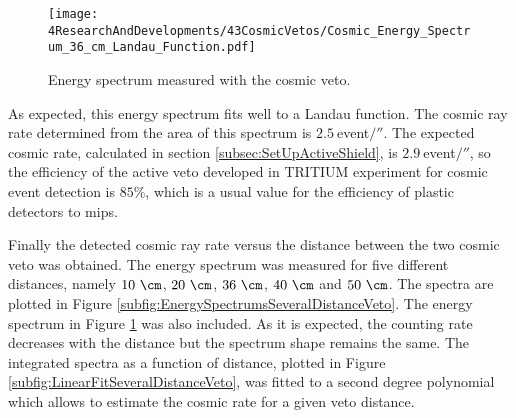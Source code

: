 \begin{figure}[h]
\centering
\texttt{[image: 4ResearchAndDevelopments/43CosmicVetos/Cosmic\_Energy\_Spectrum\_36\_cm\_Landau\_Function.pdf]}
\caption{Energy spectrum measured with the cosmic veto.\label{fig:EnergySpectrumCosmicVeto}}
\end{figure}
As expected, this energy spectrum fits well to a Landau function. The cosmic ray rate determined from the area of this spectrum is $2.5~$event$/\second$. The expected cosmic rate, calculated in section \ref{subsec:SetUpActiveShield}, is $2.9~$event$/\second$, so the efficiency of the active veto developed in TRITIUM experiment for cosmic event detection is $85\%$, which is a usual value for the efficiency of plastic detectors to mips.

Finally the detected cosmic ray rate versus the distance between the two cosmic veto was obtained. The energy spectrum was measured for five different distances, namely $10~\cm$, $20~\cm$, $36~\cm$, $40~\cm$ and $50~\cm$. The spectra are plotted in Figure \ref{subfig:EnergySpectrumsSeveralDistanceVeto}. The energy spectrum in Figure \ref{fig:EnergySpectrumCosmicVeto} was also included. As it is expected, the counting rate decreases with the distance but the spectrum shape remains the same. The integrated spectra as a function of distance, plotted in Figure \ref{subfig:LinearFitSeveralDistanceVeto}, was fitted to a second degree polynomial which allows to estimate the cosmic rate for a given veto distance.





